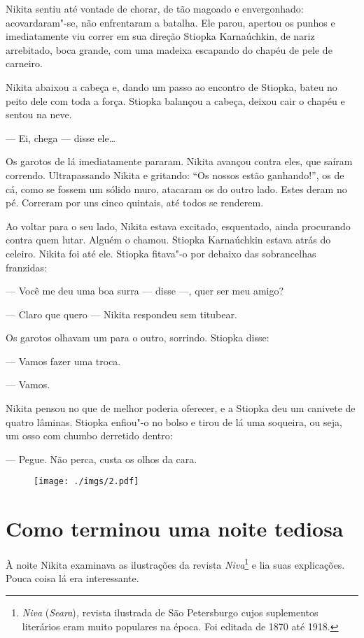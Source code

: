 Nikita sentiu até vontade de chorar, de tão magoado e envergonhado:
acovardaram"-se, não enfrentaram a batalha. Ele parou, apertou os punhos
e imediatamente viu correr em sua direção Stiopka Karnaúchkin, de nariz
arrebitado, boca grande, com uma madeixa escapando do chapéu de pele de
carneiro.

Nikita abaixou a cabeça e, dando um passo ao encontro de Stiopka, bateu
no peito dele com toda a força. Stiopka balançou a cabeça, deixou cair o
chapéu e sentou na neve.

--- Ei, chega --- disse ele\ldots{}

Os garotos de lá imediatamente pararam. Nikita avançou contra
eles, que saíram correndo. Ultrapassando Nikita e gritando: ``Os nossos
estão ganhando!'', os de cá, como se fossem um sólido muro, atacaram os
do outro lado. Estes deram no pé. Correram por uns cinco quintais, até
todos se renderem.

Ao voltar para o seu lado, Nikita estava excitado, esquentado, ainda
procurando contra quem lutar. Alguém o chamou. Stiopka Karnaúchkin
estava atrás do celeiro. Nikita foi até ele. Stiopka fitava"-o por
debaixo das sobrancelhas franzidas:

--- Você me deu uma boa surra --- disse ---, quer ser meu amigo?

--- Claro que quero --- Nikita respondeu sem titubear.

Os garotos olhavam um para o outro, sorrindo. Stiopka disse:

--- Vamos fazer uma troca.

--- Vamos.

Nikita pensou no que de melhor poderia oferecer, e a Stiopka deu um
canivete de quatro lâminas. Stiopka enfiou"-o no bolso e tirou de lá uma
soqueira, ou seja, um osso com chumbo derretido dentro:

--- Pegue. Não perca, custa os olhos da cara.

\begin{figure}
\vspace*{-2.1cm}
\hspace*{-2.5cm}\texttt{[image: ./imgs/2.pdf]}
\end{figure}

\chapter{Como terminou uma noite tediosa}

À noite Nikita examinava as ilustrações da revista \emph{Niva}\footnote{\emph{Niva}
  (\emph{Seara})\emph{,} revista ilustrada de São Petersburgo cujos
  suplementos literários eram muito populares na época. Foi editada de
  1870 até 1918.} e lia suas explicações. Pouca coisa lá era
interessante.

